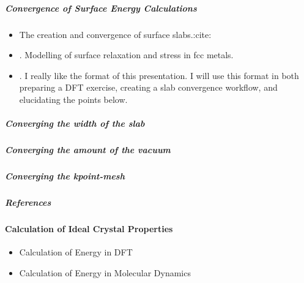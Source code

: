 \documentclass[letterpaper,10pt,english]{sphinxmanual}
\begin{document}
\subparagraph{Convergence of Surface Energy Calculations}
\label{\detokenize{calc_material_properties/calc_surface_energy:convergence-of-surface-energy-calculations}}\begin{itemize}
\item {} 
The creation and convergence of surface slabs.:cite:

\item {} 
\label{\detokenize{calc_material_properties/calc_surface_energy:id3}}{\hyperref[\detokenize{calc_material_properties/calc_surface_energy:wan1999surface}]{\sphinxcrossref{{[}WFG+99{]}}}}.  Modelling of surface relaxation and stress in fcc metals.

\item {} 
.  I really like the format of this presentation.  I will use this format in both preparing a DFT exercise, creating a slab convergence workflow, and elucidating the points below.

\end{itemize}


\subparagraph{Converging the width of the slab}
\label{\detokenize{calc_material_properties/calc_surface_energy:converging-the-width-of-the-slab}}

\subparagraph{Converging the amount of the vacuum}
\label{\detokenize{calc_material_properties/calc_surface_energy:converging-the-amount-of-the-vacuum}}

\subparagraph{Converging the kpoint-mesh}
\label{\detokenize{calc_material_properties/calc_surface_energy:converging-the-kpoint-mesh}}


\subparagraph{References}
\label{\detokenize{calc_material_properties/calc_surface_energy:references}}



\paragraph{Calculation of Ideal Crystal Properties}
\label{\detokenize{calc_material_properties/index:calculation-of-ideal-crystal-properties}}\begin{itemize}
\item {} 
Calculation of Energy in DFT

\item {} 
Calculation of Energy in Molecular Dynamics

\end{itemize}
\end{document}
